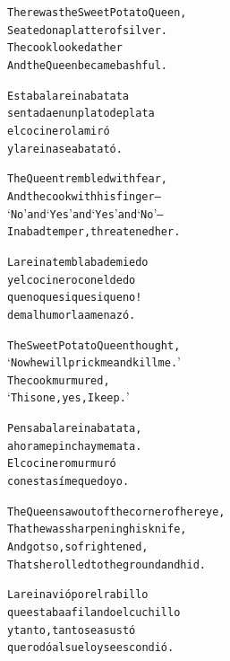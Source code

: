 \documentclass[11pt,a4paper]{article}
\begin{document}
\begin{parcolumns}{2}

\colchunk
{
\begin{alltt}\normalfont
There was the Sweet Potato Queen,
Seated on a platter of silver.
The cook looked at her
And the Queen became bashful.
\end{alltt}
}

\colchunk
{
\begin{alltt}\normalfont
Estaba la reina batata
sentada en un plato de plata
el cocinero la miró
y la reina se abatató.
\end{alltt}
}

\colplacechunks

\colchunk
{
\begin{alltt}\normalfont
The Queen trembled with fear,
And the cook with his finger –
‘No’ and ‘Yes’ and ‘Yes’ and ‘No’ –
In a bad temper, threatened her.
\end{alltt}
}

\colchunk
{
\begin{alltt}\normalfont
La reina temblaba de miedo
y el cocinero con el dedo
que no que si que si que no!
de mal humor la amenazó.
\end{alltt}
}

\colplacechunks

\colchunk
{
\begin{alltt}\normalfont
The Sweet Potato Queen thought,
‘Now he will prick me and kill me.’
The cook murmured,
‘This one, yes, I keep.’
\end{alltt}
}

\colchunk
{
\begin{alltt}\normalfont
Pensaba la reina batata,
ahora me pincha y me mata.
El cocinero murmuró
con esta sí me quedo yo.
\end{alltt}
}

\colplacechunks

\colchunk
{
\begin{alltt}\normalfont
The Queen saw out of the corner of her eye,
That he was sharpening his knife,
And got so, so frightened,
That she rolled to the ground and hid.
\end{alltt}
}

\colchunk
{
\begin{alltt}\normalfont
La reina vió por el rabillo
que estaba afilando el cuchillo
y tanto, tanto se asustó
que rodó al suelo y se escondió.
\end{alltt}
}

\colplacechunks


\end{parcolumns}
\end{document}
